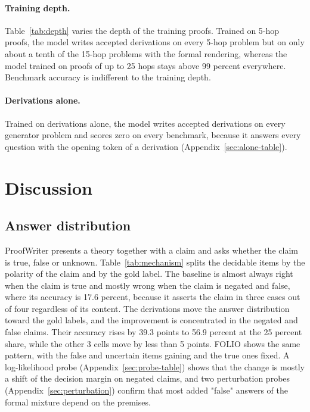 \documentclass{article}
\begin{document}


\paragraph{Training depth.}
Table~\ref{tab:depth} varies the depth of the training proofs. Trained on 5-hop proofs, the model writes accepted derivations on every
5-hop problem but on only about a tenth of the 15-hop problems with the
formal rendering, whereas the model trained on proofs of up to 25 hops stays
above 99 percent everywhere. Benchmark accuracy is indifferent to the
training depth.



\paragraph{Derivations alone.}
Trained on derivations alone, the model writes accepted derivations on every
generator problem and scores zero on every benchmark, because it answers every
question with the opening token of a derivation (Appendix~\ref{sec:alone-table}).

\section{Discussion}
\label{sec:discussion}

\subsection{Answer distribution}
\label{sec:prior}

ProofWriter presents a theory together with a claim and asks whether the
claim is true, false or unknown. Table~\ref{tab:mechanism} splits the
decidable items by the polarity of the claim and by the gold label. The baseline
is almost always right when the claim is true and mostly wrong when the
claim is negated and false, where its accuracy is 17.6 percent, because it
asserts the claim in three cases out of four regardless of its content. The
derivations move the answer distribution toward the gold labels, and the
improvement is concentrated in the negated and false claims. Their accuracy
rises by 39.3 points to 56.9 percent at the 25 percent share, while the
other 3 cells move by less than 5 points. FOLIO shows the same
pattern, with the false and uncertain items gaining and the true ones
fixed. A log-likelihood probe
(Appendix~\ref{sec:probe-table}) shows that the change is mostly a shift of the
decision margin on negated claims, and two perturbation probes
(Appendix~\ref{sec:perturbation}) confirm that most added "false" answers of the formal mixture depend on the premises.
\end{document}
